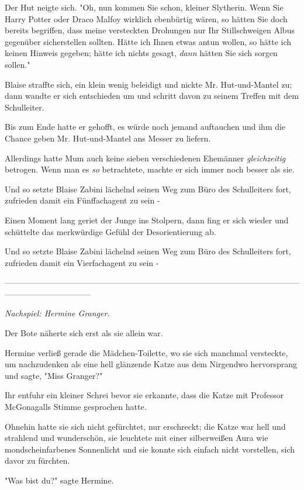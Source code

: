 {Der Hut neigte sich. "Oh, nun kommen Sie schon, kleiner Slytherin. Wenn Sie Harry Potter oder Draco Malfoy wirklich ebenbürtig wären, so hätten Sie doch bereits begriffen, dass meine versteckten Drohungen nur Ihr Stillschweigen Albus gegenüber sicherstellen sollten. Hätte ich Ihnen etwas antun wollen, so hätte ich keinen Hinweis gegeben; hätte ich nichts gesagt, \emph{dann} hätten Sie sich sorgen sollen."

Blaise straffte sich, ein klein wenig beleidigt und nickte Mr. Hut-und-Mantel zu; dann wandte er sich entschieden um und schritt davon zu seinem Treffen mit dem Schulleiter.

Bis zum Ende hatte er gehofft, es würde noch jemand auftauchen und ihm die Chance geben Mr. Hut-und-Mantel ans Messer zu liefern.

Allerdings hatte Mum auch keine sieben verschiedenen Ehemänner \emph{gleichzeitig} betrogen. Wenn man es \emph{so} betrachtete, machte er sich immer noch besser als sie.

Und so setzte Blaise Zabini lächelnd seinen Weg zum Büro des Schulleiters fort, zufrieden damit ein Fünffachagent zu sein -

Einen Moment lang geriet der Junge ins Stolpern, dann fing er sich wieder und schüttelte das merkwürdige Gefühl der Desorientierung ab.

Und so setzte Blaise Zabini lächelnd seinen Weg zum Büro des Schulleiters fort, zufrieden damit ein Vierfachagent zu sein -

--------------------------------------------------------------------------------------------------------------------------------------------

\emph{Nachspiel: Hermine Granger.}

Der Bote näherte sich erst als sie allein war.

Hermine verließ gerade die Mädchen-Toilette, wo sie sich manchmal versteckte, um nachzudenken als eine hell glänzende Katze aus dem Nirgendwo hervorsprang und sagte, "Miss Granger?"

Ihr entfuhr ein kleiner Schrei bevor sie erkannte, dass die Katze mit Professor McGonagalls Stimme gesprochen hatte.

Ohnehin hatte sie sich nicht gefürchtet, nur erschreckt; die Katze war hell und strahlend und wunderschön, sie leuchtete mit einer silberweißen Aura wie mondscheinfarbenes Sonnenlicht und sie konnte sich einfach nicht vorstellen, sich davor zu fürchten.

"Was bist du?" sagte Hermine.

}
